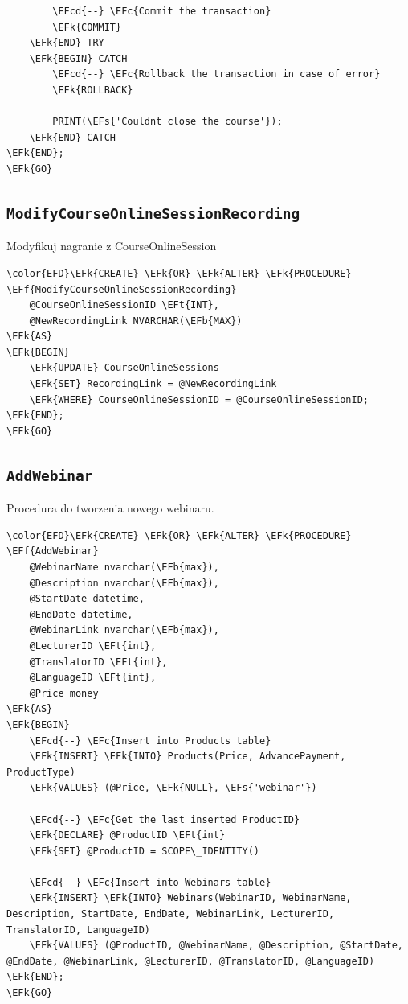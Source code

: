 \documentclass[11pt]{article}
\newcommand{\EFc}[1]{\textcolor{EFc}{\textit{#1}}} %
\newcommand{\EFcd}[1]{\textcolor{EFcd}{\textit{#1}}} %
\newcommand{\EFs}[1]{\textcolor{EFs}{#1}} %
\newcommand{\EFk}[1]{\textcolor{EFk}{\textbf{#1}}} %
\newcommand{\EFb}[1]{\textcolor{EFb}{\textbf{#1}}} %
\newcommand{\EFf}[1]{\textcolor{EFf}{#1}} %
\newcommand{\EFt}[1]{\textcolor{EFt}{\textbf{#1}}} %
\begin{document}
\begin{Code}
\begin{Verbatim}
        \EFcd{--} \EFc{Commit the transaction}
        \EFk{COMMIT}
    \EFk{END} TRY
    \EFk{BEGIN} CATCH
        \EFcd{--} \EFc{Rollback the transaction in case of error}
        \EFk{ROLLBACK}

        PRINT(\EFs{'Couldnt close the course'});
    \EFk{END} CATCH
\EFk{END};
\EFk{GO}
\end{Verbatim}
\end{Code}
\subsection{\texttt{ModifyCourseOnlineSessionRecording}}
\label{sec:org33a1d6c}
Modyfikuj nagranie z CourseOnlineSession
\begin{Code}
\begin{Verbatim}
\color{EFD}\EFk{CREATE} \EFk{OR} \EFk{ALTER} \EFk{PROCEDURE} \EFf{ModifyCourseOnlineSessionRecording}
    @CourseOnlineSessionID \EFt{INT},
    @NewRecordingLink NVARCHAR(\EFb{MAX})
\EFk{AS}
\EFk{BEGIN}
    \EFk{UPDATE} CourseOnlineSessions
    \EFk{SET} RecordingLink = @NewRecordingLink
    \EFk{WHERE} CourseOnlineSessionID = @CourseOnlineSessionID;
\EFk{END};
\EFk{GO}
\end{Verbatim}
\end{Code}
\subsection{\texttt{AddWebinar}}
\label{sec:org0dc0d99}
Procedura do tworzenia nowego webinaru.
\begin{Code}
\begin{Verbatim}
\color{EFD}\EFk{CREATE} \EFk{OR} \EFk{ALTER} \EFk{PROCEDURE} \EFf{AddWebinar}
    @WebinarName nvarchar(\EFb{max}),
    @Description nvarchar(\EFb{max}),
    @StartDate datetime,
    @EndDate datetime,
    @WebinarLink nvarchar(\EFb{max}),
    @LecturerID \EFt{int},
    @TranslatorID \EFt{int},
    @LanguageID \EFt{int},
    @Price money
\EFk{AS}
\EFk{BEGIN}
    \EFcd{--} \EFc{Insert into Products table}
    \EFk{INSERT} \EFk{INTO} Products(Price, AdvancePayment, ProductType)
    \EFk{VALUES} (@Price, \EFk{NULL}, \EFs{'webinar'})

    \EFcd{--} \EFc{Get the last inserted ProductID}
    \EFk{DECLARE} @ProductID \EFt{int}
    \EFk{SET} @ProductID = SCOPE\_IDENTITY()

    \EFcd{--} \EFc{Insert into Webinars table}
    \EFk{INSERT} \EFk{INTO} Webinars(WebinarID, WebinarName, Description, StartDate, EndDate, WebinarLink, LecturerID, TranslatorID, LanguageID)
    \EFk{VALUES} (@ProductID, @WebinarName, @Description, @StartDate, @EndDate, @WebinarLink, @LecturerID, @TranslatorID, @LanguageID)
\EFk{END};
\EFk{GO}
\end{Verbatim}
\end{Code}
\end{document}
